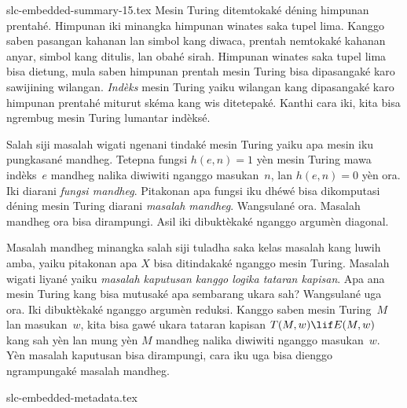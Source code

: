 \begin{filecontents*}[overwrite]{slc-embedded-summary-15.tex}
Mesin Turing ditemtokaké déning himpunan prentahé. Himpunan
iki minangka himpunan winates saka tupel lima. Kanggo saben
pasangan kahanan lan simbol kang diwaca, prentah nemtokaké
kahanan anyar, simbol kang ditulis, lan obahé sirah.
Himpunan winates saka tupel lima bisa dietung, mula saben
himpunan prentah mesin Turing bisa dipasangaké karo sawijining
wilangan. \emph{Indèks} mesin Turing yaiku wilangan kang
dipasangaké karo himpunan prentahé miturut skéma kang wis
ditetepaké. Kanthi cara iki, kita bisa ngrembug mesin Turing
lumantar indèksé.

Salah siji masalah wigati ngenani tindaké mesin Turing yaiku
apa mesin iku pungkasané mandheg. Tetepna fungsi $h(e,n)=1$
yèn mesin Turing mawa indèks~$e$ mandheg nalika diwiwiti
nganggo masukan~$n$, lan $h(e,n)=0$ yèn ora. Iki diarani
\emph{fungsi mandheg}. Pitakonan apa fungsi iku dhéwé bisa
dikomputasi déning mesin Turing diarani \emph{masalah mandheg}.
Wangsulané ora. Masalah mandheg ora bisa dirampungi. Asil iki
dibuktèkaké nganggo argumèn diagonal.

Masalah mandheg minangka salah siji tuladha saka kelas masalah
kang luwih amba, yaiku pitakonan apa $X$ bisa ditindakaké
nganggo mesin Turing. Masalah wigati liyané yaiku
\emph{masalah kaputusan kanggo logika tataran kapisan}.
Apa ana mesin Turing kang bisa mutusaké apa sembarang ukara
sah? Wangsulané uga ora. Iki dibuktèkaké nganggo argumèn
reduksi. Kanggo saben mesin Turing~$M$ lan masukan~$w$,
kita bisa gawé ukara tataran kapisan $T(M,w)\lif E(M,w)$
kang sah yèn lan mung yèn $M$ mandheg nalika diwiwiti nganggo
masukan~$w$. Yèn masalah kaputusan bisa dirampungi, cara iku
uga bisa dienggo ngrampungaké masalah mandheg.
\end{filecontents*}

\begin{filecontents*}[overwrite]{slc-embedded-metadata.tex}
\renewcommand*{\OLPtitlecoverfont}{\fontsize{44pt}{48pt}\sffamily\bfseries}
\renewcommand*{\OLPsubtitlecoverfont}{\fontsize{21pt}{24pt}\sffamily\bfseries}

\end{filecontents*}

